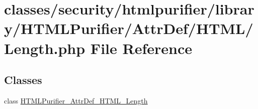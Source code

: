 \hypertarget{AttrDef_2HTML_2Length_8php}{\section{classes/security/htmlpurifier/library/\+H\+T\+M\+L\+Purifier/\+Attr\+Def/\+H\+T\+M\+L/\+Length.php File Reference}
\label{AttrDef_2HTML_2Length_8php}
}
\subsection*{Classes}
\begin{DoxyCompactItemize}
\item 
class \hyperlink{classHTMLPurifier__AttrDef__HTML__Length}{H\+T\+M\+L\+Purifier\+\_\+\+Attr\+Def\+\_\+\+H\+T\+M\+L\+\_\+\+Length}
\end{DoxyCompactItemize}
